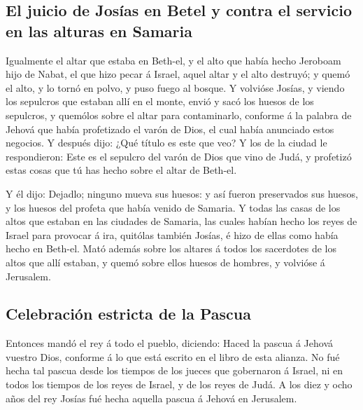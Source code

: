 \hypertarget{el-juicio-de-josuxedas-en-betel-y-contra-el-servicio-en-las-alturas-en-samaria}{%
\subsection{El juicio de Josías en Betel y contra el servicio en las
alturas en
Samaria}\label{el-juicio-de-josuxedas-en-betel-y-contra-el-servicio-en-las-alturas-en-samaria}}

 Igualmente el altar que estaba en Beth-el, y el alto que
había hecho Jeroboam hijo de Nabat, el que hizo pecar á Israel, aquel
altar y el alto destruyó; y quemó el alto, y lo tornó en polvo, y puso
fuego al bosque.  Y volvióse Josías, y viendo los sepulcros
que estaban allí en el monte, envió y sacó los huesos de los sepulcros,
y quemólos sobre el altar para contaminarlo, conforme á la palabra de
Jehová que había profetizado el varón de Dios, el cual había anunciado
estos negocios.  Y después dijo: ¿Qué título es este que
veo? Y los de la ciudad le respondieron: Este es el sepulcro del varón
de Dios que vino de Judá, y profetizó estas cosas que tú has hecho sobre
el altar de Beth-el.

 Y él dijo: Dejadlo; ninguno mueva sus huesos: y así fueron
preservados sus huesos, y los huesos del profeta que había venido de
Samaria.  Y todas las casas de los altos que estaban en las
ciudades de Samaria, las cuales habían hecho los reyes de Israel para
provocar á ira, quitólas también Josías, é hizo de ellas como había
hecho en Beth-el.  Mató además sobre los altares á todos
los sacerdotes de los altos que allí estaban, y quemó sobre ellos huesos
de hombres, y volvióse á Jerusalem.

\hypertarget{celebraciuxf3n-estricta-de-la-pascua}{%
\subsection{Celebración estricta de la
Pascua}\label{celebraciuxf3n-estricta-de-la-pascua}}

 Entonces mandó el rey á todo el pueblo, diciendo: Haced la
pascua á Jehová vuestro Dios, conforme á lo que está escrito en el libro
de esta alianza.  No fué hecha tal pascua desde los tiempos
de los jueces que gobernaron á Israel, ni en todos los tiempos de los
reyes de Israel, y de los reyes de Judá.  A los diez y ocho
años del rey Josías fué hecha aquella pascua á Jehová en Jerusalem.

